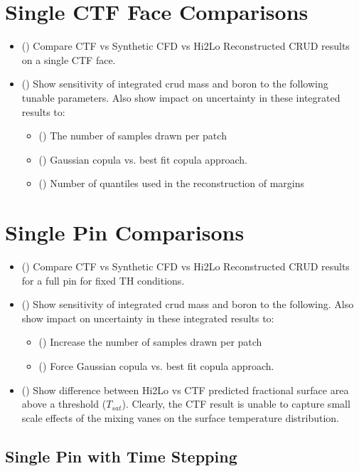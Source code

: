 \section{Single CTF Face Comparisons}
\begin{itemize}
	\item (\checkmark) Compare CTF vs Synthetic CFD vs Hi2Lo Reconstructed CRUD results on a single CTF face.
	\item (\checkmark) Show sensitivity of integrated crud mass and boron to the following tunable parameters.  Also show impact on uncertainty in these integrated results to:
	\begin{itemize}
		\item (\checkmark) The number of samples drawn per patch
		\item (\checkmark) Gaussian copula vs. best fit copula approach.
		\item (\checkmark) Number of quantiles used in the reconstruction of margins
	\end{itemize}
\end{itemize}

\section{Single Pin Comparisons}

\begin{itemize}
	\item (\checkmark) Compare CTF vs Synthetic CFD vs Hi2Lo Reconstructed CRUD results for a full pin for fixed TH conditions.
	\item (\checkmark) Show sensitivity of integrated crud mass and boron to the following.  Also show impact on uncertainty in these integrated results to:
	\begin{itemize}
		\item (\checkmark) Increase the number of samples drawn per patch
		\item (\checkmark) Force Gaussian copula vs. best fit copula approach.
	\end{itemize}
	\item (\checkmark) Show difference between Hi2Lo vs CTF predicted fractional surface area above a threshold ($T_{sat}$).  Clearly, the CTF result
	is unable to capture small scale effects of the mixing vanes on the surface temperature distribution.
\end{itemize}

\subsection{Single Pin with Time Stepping}

